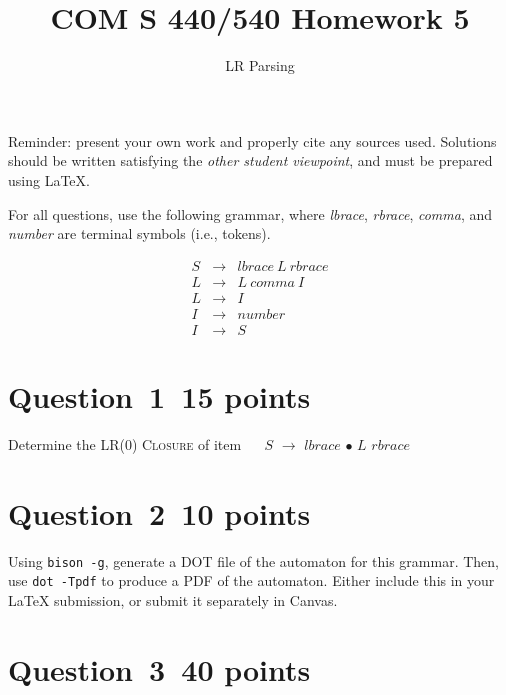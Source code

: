 \documentclass[10pt]{article}
\title{COM S 440/540 Homework 5}
\date{}
\author{LR Parsing}
\begin{document}
\maketitle

\noindent
Reminder: present your own work and properly cite any sources used.
Solutions should be written satisfying the \emph{other student viewpoint},
and must be prepared using \LaTeX.
\renewcommand{\thepage}{~}
 
 
For all questions, use the following grammar, where
\emph{lbrace}, \emph{rbrace}, \emph{comma}, and \emph{number}
are terminal symbols (i.e., tokens).

\begin{eqnarray}
  S & \rightarrow & \mathit{lbrace} ~L~ \mathit{rbrace}
\\
  L & \rightarrow & L ~\mathit{comma}~ I
\\
  L & \rightarrow & I
\\
  I & \rightarrow & \mathit{number}
\\
  I & \rightarrow & S
\end{eqnarray}


\section*{Question~1~\hfill 15 points}

Determine the LR(0) \textsc{Closure} of item ~~
$S$ $\rightarrow$ $\mathit{lbrace}$ $\bullet$ $L$ $\mathit{rbrace}$

\section*{Question~2~\hfill 10 points}

Using {\tt bison -g}, generate a DOT file of the automaton
for this grammar.
Then, use {\tt dot -Tpdf} to produce a PDF of the automaton.
Either include this in your \LaTeX{} submission, or submit it separately
in Canvas.


\section*{Question~3~\hfill 40 points}
\end{document}
